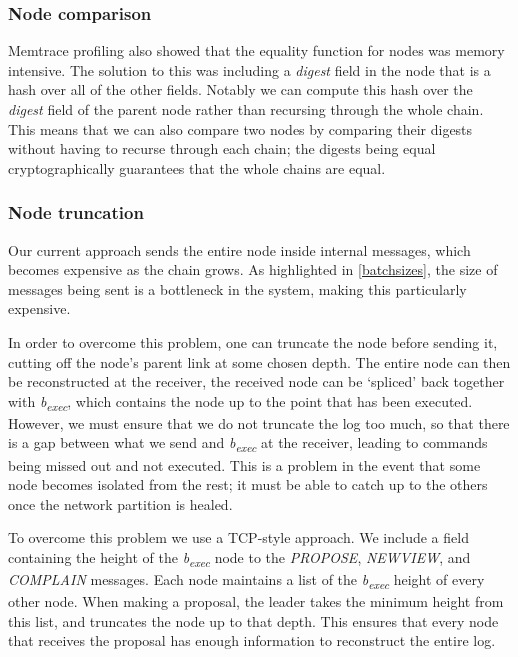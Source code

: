 \subsubsection{Node comparison}
Memtrace profiling also showed that the equality function for nodes was memory intensive. The solution to this was including a \textit{digest} field in the node that is a hash over all of the other fields. Notably we can compute this hash over the \textit{digest} field of the parent node rather than recursing through the whole chain. This means that we can also compare two nodes by comparing their digests without having to recurse through each chain; the digests being equal cryptographically guarantees that the whole chains are equal.

\subsubsection{Node truncation}
Our current approach sends the entire node inside internal messages, which becomes expensive as the chain grows. As highlighted in \ref{batchsizes}, the size of messages being sent is a bottleneck in the system, making this particularly expensive.

In order to overcome this problem, one can truncate the node before sending it, cutting off the node's parent link at some chosen depth. The entire node can then be reconstructed at the receiver, the received node can be `spliced' back together with \textit{b\textsubscript{exec}}, which contains the node up to the point that has been executed. However, we must ensure that we do not truncate the log too much, so that there is a gap between what we send and \textit{b\textsubscript{exec}} at the receiver, leading to commands being missed out and not executed. This is a problem in the event that some node becomes isolated from the rest; it must be able to catch up to the others once the network partition is healed.

To overcome this problem we use a TCP-style approach. We include a field containing the height of the \textit{b\textsubscript{exec}} node to the \textit{PROPOSE}, \textit{NEW{\large V}IEW}, and \textit{COMPLAIN} messages. Each node maintains a list of the \textit{b\textsubscript{exec}} height of every other node. When making a proposal, the leader takes the minimum height from this list, and truncates the node up to that depth. This ensures that every node that receives the proposal has enough information to reconstruct the entire log.

